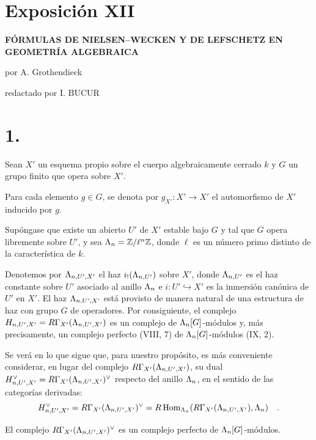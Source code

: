 \section*{Exposición XII}

\begin{center}
\Large\bf FÓRMULAS DE NIELSEN--WECKEN Y DE LEFSCHETZ EN GEOMETRÍA ALGEBRAICA
\end{center}

\begin{center}
por A. Grothendieck

redactado por I. BUCUR
\end{center}

\bigskip

\section*{1.}
Sean $X'$ un esquema propio sobre el cuerpo algebraicamente cerrado $k$ y $G$ un grupo finito que opera sobre $X'$.

Para cada elemento $g \in G$, se denota por $g_{X'} : X' \to X'$ el automorfismo de $X'$ inducido por $g$.

Supóngase que existe un abierto $U'$ de $X'$ estable bajo $G$ y tal que $G$ opera libremente sobre $U'$, y sea $\Lambda_n = \mathbb Z/\ell^n\mathbb Z$, donde $\ell$ es un número primo distinto de la característica de $k$.

Denotemos por $\Lambda_{n,U',X'}$ el haz $i_!(\Lambda_{n,U'})$ sobre $X'$, donde $\Lambda_{n,U'}$ es el haz constante sobre $U'$ asociado al anillo $\Lambda_n$ e $i : U' \hookrightarrow X'$ es la inmersión canónica de $U'$ en $X'$. El haz $\Lambda_{n,U',X'}$ está provisto de manera natural de una estructura de haz con grupo $G$ de operadores. Por consiguiente, el complejo $H_{n,U',X'} = R\Gamma_{X'}(\Lambda_{n,U',X'})$ es un complejo de $\Lambda_n[G]$-módulos y, más precisamente, un complejo perfecto (VIII, 7) de $\Lambda_n[G]$-módulos (IX, 2).

Se verá en lo que sigue que, para nuestro propósito, es más conveniente considerar, en lugar del complejo $R\Gamma_{X'}(\Lambda_{n,U',X'})$, su dual $H_{n,U',X'}^\vee = R\Gamma_{X'}(\Lambda_{n,U',X'})^\vee$ respecto del anillo $\Lambda_n$, en el sentido de las categorías derivadas:
\[
H_{n,U',X'}^\vee = R\Gamma_{X'}(\Lambda_{n,U',X'})^\vee = R\operatorname{Hom}_{\Lambda_n}(R\Gamma_{X'}(\Lambda_{n,U',X'}), \Lambda_n) \quad .
\]

El complejo $R\Gamma_{X'}(\Lambda_{n,U',X'})^\vee$ es un complejo perfecto de $\Lambda_n[G]$-módulos.
